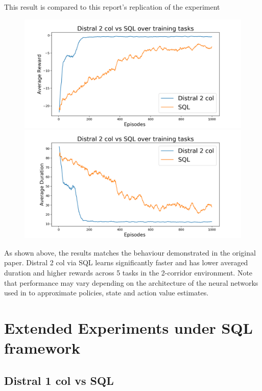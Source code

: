 \documentclass[12pt]{report}
\begin{document}
This result is compared to this report's replication of the experiment
\begin{figure}[H]
\centering
\begin{minipage}{.5\textwidth}
\centering
\includegraphics[width=\textwidth]{figs/distral_2_col_SQL_avg_rwd.png}
\end{minipage}%
\centering
\begin{minipage}{.5\textwidth}
\centering
\includegraphics[width=\textwidth]{figs/distral_2_col_SQL_avg_dur.png}
\end{minipage}%
\end{figure}
As shown above, the results matches the behaviour demonstrated in the original paper. Distral 2 col via SQL learns significantly faster and has lower averaged duration and higher rewards across 5 tasks in the 2-corridor environment. Note that performance may vary depending on the architecture of the neural networks used in to approximate policies, state and action value estimates.

\section{Extended Experiments under SQL framework}
\subsection{Distral 1 col vs SQL}
\end{document}
